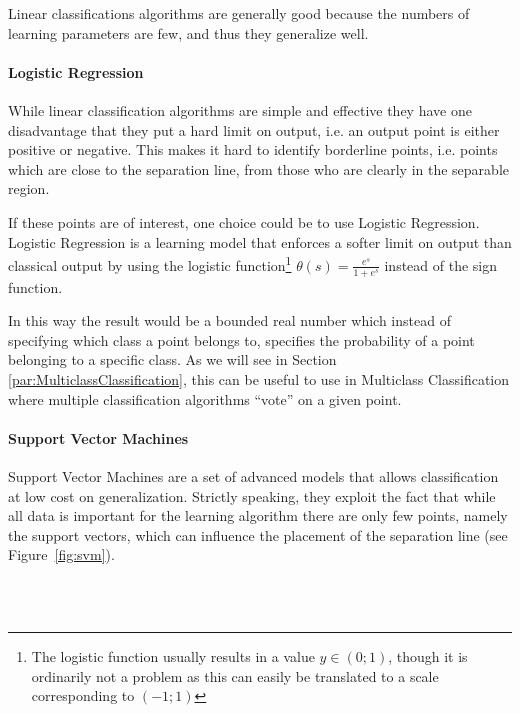 Linear classifications algorithms are generally good because the numbers of learning parameters are few, and thus they generalize well.

\paragraph{Logistic Regression}
\label{par:LogisticRegression}
While linear classification algorithms are simple and effective they have one disadvantage that they put a hard limit on output,
i.e. an output point is either positive or negative.
This makes it hard to identify borderline points, i.e. points which are close to the separation line, from those who are clearly in the separable region.

If these points are of interest, one choice could be to use Logistic Regression.
Logistic Regression is a learning model that enforces a softer limit on output than classical output by using the logistic function\footnote{The logistic function usually results in a value $y \in \left(0;1\right)$, though it is ordinarily not a problem as
this can easily be translated to a scale corresponding to $\left(-1;1\right)$}
$\theta(s) = \frac{e^s}{1+e^s}$ instead of the sign function.

In this way the result would be a bounded real number which instead of specifying which class a point belongs to, specifies the probability of a point belonging to a specific class.
As we will see in Section \ref{par:MulticlassClassification}, this can be useful to use in Multiclass Classification where multiple classification algorithms ``vote'' on a given point.
\paragraph{Support Vector Machines}
\label{par:SupportVectorMachines}

Support Vector Machines are a set of advanced models that allows classification at low cost on generalization.
Strictly speaking, they exploit the fact that while all data is important for the learning algorithm there 
are only few points, namely the support vectors, which can influence the placement of the separation line (see Figure~\ref{fig:svm}).

\begin{minipage}{\linewidth}
\centering
{}
\label{fig:svm}
\end{minipage}\\\\

